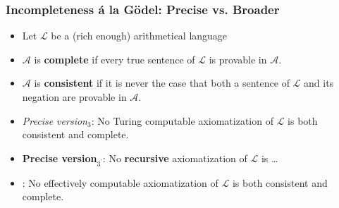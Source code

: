 \begin{frame}
\frametitle{Incompleteness \'a la G\"odel: Precise vs. Broader}

\begin{itemize}[<+->]

\item Let $\mathcal{L}$ be a (rich enough) arithmetical language

\item  $\mathcal{A}$ is \textbf{complete} if every true sentence of  $\mathcal{L}$ is provable in $\mathcal{A}$.

\item  $\mathcal{A}$ is \textbf{consistent} if it is never the case that both a sentence of  $\mathcal{L}$ and its negation are provable in  $\mathcal{A}$.


\item \emph{Precise version$_3$}: No \textcolor{highlightA}{Turing computable} axiomatization of $\mathcal{L}$ is both consistent and complete.

\item \textbf{Precise version$_{3^{'}}$}: No \textbf{recursive} axiomatization of $\mathcal{L}$ is \dots %

\item {}: No \textcolor{OGlyallpink}{effectively computable} axiomatization of $\mathcal{L}$ is both consistent and complete. 

\end{itemize}
\end{frame}


